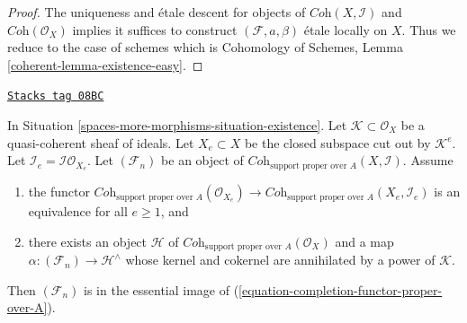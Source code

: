 \begin{proof}
The uniqueness and \'etale descent for objects of
$\textit{Coh}(X, \mathcal{I})$ and $\textit{Coh}(\mathcal{O}_X)$
implies it suffices to construct $(\mathcal{F}, a, \beta)$ \'etale
locally on $X$. Thus we reduce to the case of schemes which is
Cohomology of Schemes, Lemma \ref{coherent-lemma-existence-easy}.
\end{proof}

\begin{lemma}
\label{spaces-more-morphisms-lemma-existence-tricky}
\href{https://stacks.math.columbia.edu/tag/08BC}{\texttt{Stacks tag 08BC}}

In Situation \ref{spaces-more-morphisms-situation-existence}. Let $\mathcal{K} \subset \mathcal{O}_X$
be a quasi-coherent sheaf of ideals. Let $X_e \subset X$ be the closed subspace
cut out by $\mathcal{K}^e$. Let $\mathcal{I}_e = \mathcal{I}\mathcal{O}_{X_e}$.
Let $(\mathcal{F}_n)$ be an object of
$\textit{Coh}_{\text{support proper over } A}(X, \mathcal{I})$.
Assume
\begin{enumerate}
\item the functor
$\textit{Coh}_{\text{support proper over } A}(\mathcal{O}_{X_e})
\to \textit{Coh}_{\text{support proper over } A}(X_e, \mathcal{I}_e)$
is an equivalence for all $e \geq 1$, and
\item there exists an object $\mathcal{H}$ of
$\textit{Coh}_{\text{support proper over } A}(\mathcal{O}_X)$ and a map
$\alpha : (\mathcal{F}_n) \to \mathcal{H}^\wedge$ whose
kernel and cokernel are annihilated by a power of $\mathcal{K}$.
\end{enumerate}
Then $(\mathcal{F}_n)$ is in the essential image of
(\ref{equation-completion-functor-proper-over-A}).
\end{lemma}

